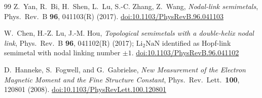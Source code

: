 \documentclass[11pt,a4paper]{article}
\theoremstyle{definition}
\theoremstyle{remark}
\begin{document}
\begin{thebibliography}{99}
Z.~Yan, R.~Bi, H.~Shen, L.~Lu, S.-C. Zhang, Z.~Wang,
\textit{Nodal-link semimetals},
Phys.\ Rev.\ B \textbf{96}, 041103(R) (2017).
\href{https://doi.org/10.1103/PhysRevB.96.041103}{doi:10.1103/PhysRevB.96.041103}

W.~Chen, H.-Z. Lu, J.-M. Hou,
\textit{Topological semimetals with a double-helix nodal link},
Phys.\ Rev.\ B \textbf{96}, 041102(R) (2017);
$\mathrm{Li_2NaN}$ identified as Hopf-link semimetal
with nodal linking number $\pm 1$.
\href{https://doi.org/10.1103/PhysRevB.96.041102}{doi:10.1103/PhysRevB.96.041102}

D.~Hanneke, S.~Fogwell, and G.~Gabrielse,
\textit{New Measurement of the Electron Magnetic Moment and the Fine Structure Constant},
Phys.\ Rev.\ Lett.\ \textbf{100}, 120801 (2008).
\href{https://doi.org/10.1103/PhysRevLett.100.120801}{doi:10.1103/PhysRevLett.100.120801}

\end{thebibliography}
\end{document}

